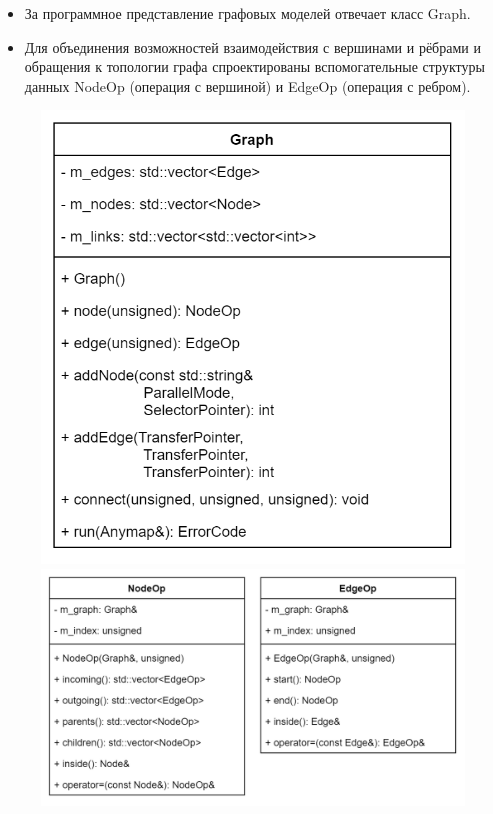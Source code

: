 \begin{frame}

    \smaller[1]

    \begin{itemize}
        \item За программное представление графовых моделей отвечает класс Graph.
        \item Для объединения возможностей взаимодействия с вершинами и рёбрами и обращения к топологии графа спроектированы вспомогательные структуры данных NodeOp (операция с вершиной) и EdgeOp (операция с ребром).
    \end{itemize}

    \begin{figure}
        \begin{minipage}{0.38\textwidth}
            \centering
            \includegraphics[width=\textwidth]{images/class.graph.png}
        \end{minipage}\hfill\begin{minipage}{0.62\textwidth}
            \centering
            \includegraphics[width=\textwidth]{images/UML.topologyOperations.png}
        \end{minipage}
    \end{figure}


\end{frame}

